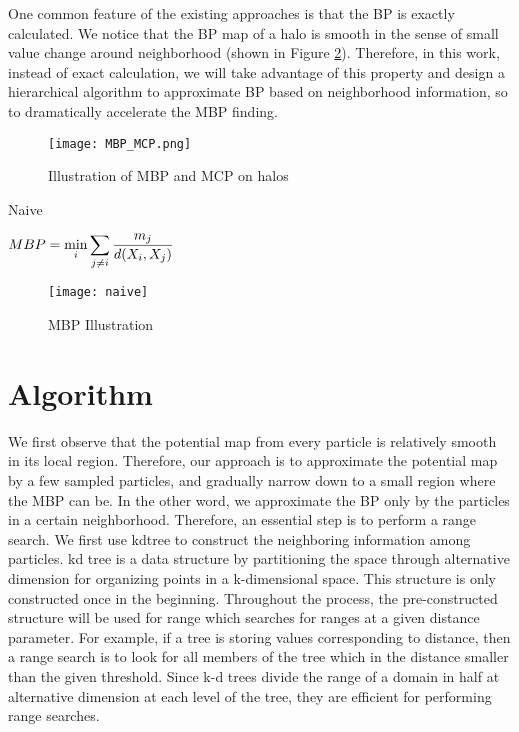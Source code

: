  
 One common feature of the existing approaches is that the BP is exactly calculated. We notice that the BP map of a halo is smooth in the sense of small value change around neighborhood (shown in Figure \ref{fig:naive}). Therefore, in this work, instead of exact calculation, we will take advantage of this property and design a hierarchical algorithm to approximate BP based on neighborhood information, so to dramatically accelerate the MBP finding. 
\begin{figure}[H]
\centering
\label{mbp_mcp}
    \texttt{[image: MBP\_MCP.png]}
    \caption{Illustration of MBP and MCP on halos}
\end{figure}
 \begin{algorithm}
\caption{Naive}
\label{naive}
\begin{algorithmic}[1]
  \State $\displaystyle MBP=\min_i \displaystyle\sum_{j\neq i}\frac{m_j}{d(X_i,X_j)}$
\end{algorithmic} 
 \end{algorithm}
\begin{figure}[H]
\centering
\texttt{[image: naive]}%
\caption{MBP Illustration}
\label{fig:naive}
\end{figure}
\section{Algorithm}
We first observe that the potential map from every particle is relatively smooth in its local region. Therefore, our approach is to approximate the potential map by a few sampled particles, and gradually narrow down to a small region where the MBP can be. In the other word, we approximate the BP only by the particles in a certain neighborhood. Therefore, an essential step is to perform a range search. We first use kdtree to construct the neighboring information among particles. kd tree is a data structure by partitioning the space through alternative dimension for organizing points in a k-dimensional space. This structure is only constructed once in the beginning. Throughout the process, the pre-constructed structure will be used for range which searches for ranges at a given distance parameter. For example, if a tree is storing values corresponding to distance, then a range search is to look for all members of the tree which in the distance smaller than the given threshold. Since k-d trees divide the range of a domain in half at alternative dimension at each level of the tree, they are efficient for performing range searches.  

